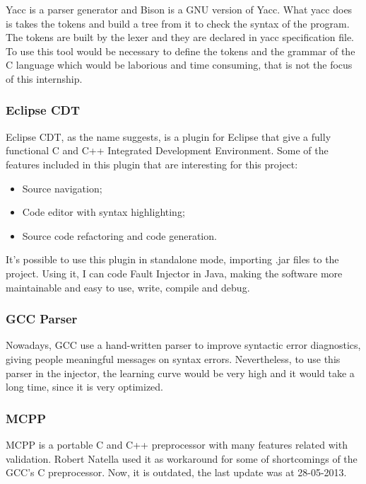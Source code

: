 Yacc is a parser generator and Bison is a GNU version of Yacc. What yacc does is takes the tokens and build a tree from it to check the syntax of the program. The tokens are built by the lexer and they are declared in yacc specification file. To use this tool would be necessary to define the tokens and the grammar of the C language which would be laborious and time consuming, that is not the focus of this internship.

\subsubsection{Eclipse CDT}

Eclipse CDT, as the name suggests, is a plugin for Eclipse that give a fully functional C and C++ Integrated Development Environment.
Some of the features included in this plugin that are interesting for this project:
\begin{itemize}
	\item Source navigation;
	\item Code editor with syntax highlighting;
	\item Source code refactoring and code generation.
\end{itemize}

It's possible to use this plugin in standalone mode, importing .jar files to the project.
Using it, I can code Fault Injector in Java, making the software more maintainable and easy to use, write, compile and debug.
\\

\subsubsection{GCC Parser}

Nowadays, GCC use a hand-written parser to improve syntactic error diagnostics, giving people meaningful messages on syntax errors. Nevertheless, to use this parser in the injector, the learning curve would be very high and it would take a long time, since it is very optimized.\\

\subsubsection{MCPP}

MCPP is a portable C and C++ preprocessor with many features related with validation. Robert Natella used it as workaround for some of shortcomings of the GCC's C preprocessor. Now, it is outdated, the last update was at 28-05-2013.\\

